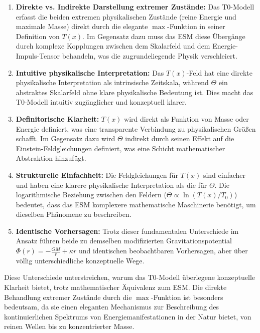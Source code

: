 \documentclass[12pt,a4paper]{article}
\newcommand{\Tfield}{T(x)}
\newcommand{\Tzero}{T_0}
\begin{document}
	\begin{enumerate}
		\item \textbf{Direkte vs. Indirekte Darstellung extremer Zustände:} Das T0-Modell erfasst die beiden extremen physikalischen Zustände (reine Energie und maximale Masse) direkt durch die elegante \(\max\)-Funktion in seiner Definition von \(\Tfield\). Im Gegensatz dazu muss das ESM diese Übergänge durch komplexe Kopplungen zwischen dem Skalarfeld und dem Energie-Impuls-Tensor behandeln, was die zugrundeliegende Physik verschleiert.
		
		\item \textbf{Intuitive physikalische Interpretation:} Das \(\Tfield\)-Feld hat eine direkte physikalische Interpretation als intrinsische Zeitskala, während \(\Theta\) ein abstraktes Skalarfeld ohne klare physikalische Bedeutung ist. Dies macht das T0-Modell intuitiv zugänglicher und konzeptuell klarer.
		
		\item \textbf{Definitorische Klarheit:} \(\Tfield\) wird direkt als Funktion von Masse oder Energie definiert, was eine transparente Verbindung zu physikalischen Größen schafft. Im Gegensatz dazu wird \(\Theta\) indirekt durch seinen Effekt auf die Einstein-Feldgleichungen definiert, was eine Schicht mathematischer Abstraktion hinzufügt.
		
		\item \textbf{Strukturelle Einfachheit:} Die Feldgleichungen für \(\Tfield\) sind einfacher und haben eine klarere physikalische Interpretation als die für \(\Theta\). Die logarithmische Beziehung zwischen den Feldern (\(\Theta \propto \ln(\Tfield/\Tzero)\)) bedeutet, dass das ESM komplexere mathematische Maschinerie benötigt, um dieselben Phänomene zu beschreiben.
		
		\item \textbf{Identische Vorhersagen:} Trotz dieser fundamentalen Unterschiede im Ansatz führen beide zu demselben modifizierten Gravitationspotential \(\Phi(r) = -\frac{GM}{r} + \kappa r\) und identischen beobachtbaren Vorhersagen, aber über völlig unterschiedliche konzeptuelle Wege.
	\end{enumerate}
	
	Diese Unterschiede unterstreichen, warum das T0-Modell überlegene konzeptuelle Klarheit bietet, trotz mathematischer Äquivalenz zum ESM. Die direkte Behandlung extremer Zustände durch die \(\max\)-Funktion ist besonders bedeutsam, da sie einen eleganten Mechanismus zur Beschreibung des kontinuierlichen Spektrums von Energiemanifestationen in der Natur bietet, von reinen Wellen bis zu konzentrierter Masse.
	
\end{document}
